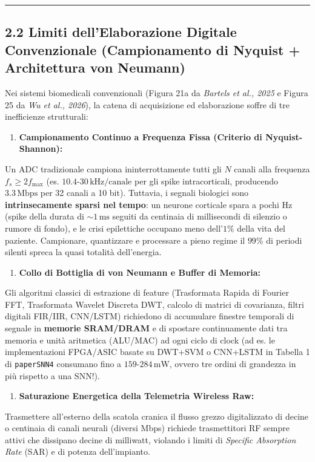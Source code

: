 \documentclass[11pt,a4paper]{article}
\begin{document}
\bigskip\hrule\bigskip

\subsection{2.2 Limiti dell'Elaborazione Digitale Convenzionale (Campionamento di Nyquist + Architettura von Neumann)}

Nei sistemi biomedicali convenzionali (Figura 21a da \textit{Bartels et al., 2025} e Figura 25 da \textit{Wu et al., 2026}), la catena di acquisizione ed elaborazione soffre di tre inefficienze strutturali:

\begin{enumerate}
  \item \textbf{Campionamento Continuo a Frequenza Fissa (Criterio di Nyquist-Shannon):}
\end{enumerate}
Un ADC tradizionale campiona ininterrottamente tutti gli $N$ canali alla frequenza $f_s \ge 2 f_{\max}$ (es. $10.4\text{-}30\,\text{kHz/canale}$ per gli spike intracorticali, producendo \textbf{$3.3\,\text{Mbps}$} per 32 canali a 10 bit). Tuttavia, i segnali biologici sono \textbf{intrinsecamente sparsi nel tempo}: un neurone corticale spara a pochi Hz (spike della durata di $\sim 1\,\text{ms}$ seguiti da centinaia di millisecondi di silenzio o rumore di fondo), e le crisi epilettiche occupano meno dell'$1\%$ della vita del paziente. Campionare, quantizzare e processare a pieno regime il $99\%$ di periodi silenti spreca la quasi totalità dell'energia.
\begin{enumerate}
  \item \textbf{Collo di Bottiglia di von Neumann e Buffer di Memoria:}
\end{enumerate}
Gli algoritmi classici di estrazione di feature (Trasformata Rapida di Fourier FFT, Trasformata Wavelet Discreta DWT, calcolo di matrici di covarianza, filtri digitali FIR/IIR, CNN/LSTM) richiedono di accumulare finestre temporali di segnale in \textbf{memorie SRAM/DRAM} e di spostare continuamente dati tra memoria e unità aritmetica (ALU/MAC) ad ogni ciclo di clock (ad es. le implementazioni FPGA/ASIC basate su DWT+SVM o CNN+LSTM in Tabella 1 di \texttt{paperSNN4} consumano fino a \textbf{$159\text{-}284\,\text{mW}$}, ovvero tre ordini di grandezza in più rispetto a una SNN!).
\begin{enumerate}
  \item \textbf{Saturazione Energetica della Telemetria Wireless Raw:}
\end{enumerate}
Trasmettere all'esterno della scatola cranica il flusso grezzo digitalizzato di decine o centinaia di canali neurali (diversi Mbps) richiede trasmettitori RF sempre attivi che dissipano decine di milliwatt, violando i limiti di \textit{Specific Absorption Rate} (SAR) e di potenza dell'impianto.
\end{document}
